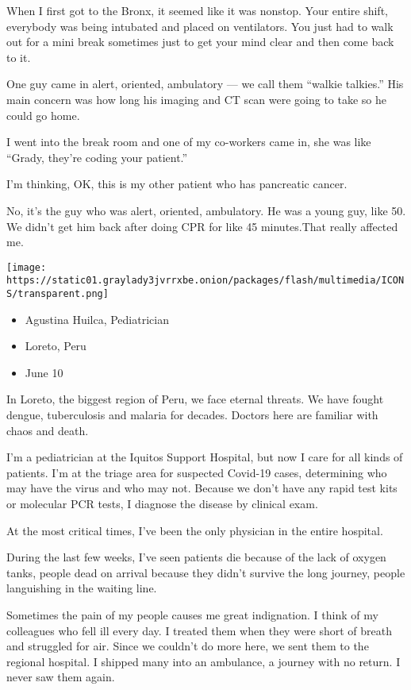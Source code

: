 When I first got to the Bronx, it seemed like it was nonstop. Your
entire shift, everybody was being intubated and placed on ventilators.
You just had to walk out for a mini break sometimes just to get your
mind clear and then come back to it.

One guy came in alert, oriented, ambulatory --- we call them ``walkie
talkies.'' His main concern was how long his imaging and CT scan were
going to take so he could go home.

I went into the break room and one of my co-workers came in, she was
like ``Grady, they're coding your patient.''

I'm thinking, OK, this is my other patient who has pancreatic cancer.

No, it's the guy who was alert, oriented, ambulatory. He was a young
guy, like 50. We didn't get him back after doing CPR for like 45
minutes.That really affected me.

\texttt{[image: https://static01.graylady3jvrrxbe.onion/packages/flash/multimedia/ICONS/transparent.png]}

\begin{itemize}
\tightlist
\item
  Agustina Huilca, Pediatrician
\item
  Loreto, Peru
\item
  June 10
\end{itemize}

In Loreto, the biggest region of Peru, we face eternal threats. We have
fought dengue, tuberculosis and malaria for decades. Doctors here are
familiar with chaos and death.

I'm a pediatrician at the Iquitos Support Hospital, but now I care for
all kinds of patients. I'm at the triage area for suspected Covid-19
cases, determining who may have the virus and who may not. Because we
don't have any rapid test kits or molecular PCR tests, I diagnose the
disease by clinical exam.

At the most critical times, I've been the only physician in the entire
hospital.

During the last few weeks, I've seen patients die because of the lack of
oxygen tanks, people dead on arrival because they didn't survive the
long journey, people languishing in the waiting line.

Sometimes the pain of my people causes me great indignation. I think of
my colleagues who fell ill every day. I treated them when they were
short of breath and struggled for air. Since we couldn't do more here,
we sent them to the regional hospital. I shipped many into an ambulance,
a journey with no return. I never saw them again.


